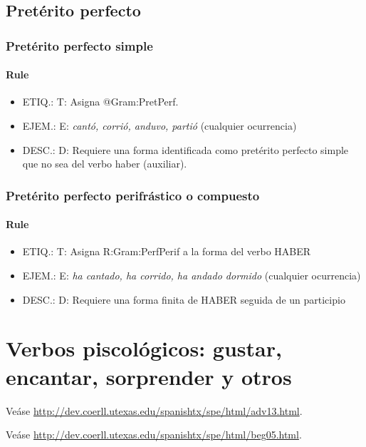 \documentclass[11pt]{report}
\begin{document}
\subsection{Pretérito perfecto}
\subsubsection{Pretérito perfecto simple}
\paragraph*{Rule}
\begin{itemize}
\item ETIQ.:  T: Asigna @Gram:PretPerf.
\item EJEM.:  E: \emph{cantó, corrió, anduvo, partió} (cualquier ocurrencia)
\item DESC.:  D: Requiere una forma identificada como pretérito perfecto simple que no sea del verbo haber (auxiliar).
\end{itemize}

\subsubsection{Pretérito perfecto perifrástico o compuesto}
\paragraph*{Rule}
\begin{itemize}
\item ETIQ.:  T: Asigna R:Gram:PerfPerif a la forma del verbo HABER
\item EJEM.:  E: \emph{ha cantado, ha corrido, ha andado dormido} (cualquier ocurrencia)
\item DESC.:  D: Requiere una forma finita de HABER seguida de un participio
\end{itemize}

\section{Verbos piscológicos: gustar, encantar, sorprender y otros}
Veáse \url{http://dev.coerll.utexas.edu/spanishtx/spe/html/adv13.html}.

Veáse \url{http://dev.coerll.utexas.edu/spanishtx/spe/html/beg05.html}.
\end{document}
